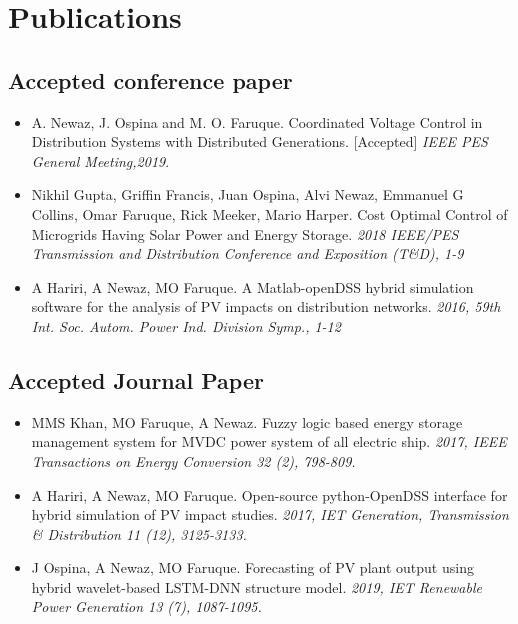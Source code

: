 

\section{Publications}
\subsection{Accepted conference paper}
\begin{itemize}
    \item A. Newaz, J. Ospina and M. O. Faruque. Coordinated Voltage Control in Distribution Systems with Distributed Generations. [Accepted] \textit{IEEE PES General Meeting,2019}.
    \item Nikhil Gupta, Griffin Francis, Juan Ospina, Alvi Newaz, Emmanuel G Collins, Omar Faruque, Rick Meeker, Mario Harper. Cost Optimal Control of Microgrids Having Solar Power and Energy Storage. \textit{2018 IEEE/PES Transmission and Distribution Conference and Exposition (T\&D), 1-9}
    \item A Hariri, A Newaz, MO Faruque. A Matlab-openDSS hybrid simulation software for the analysis of PV impacts on distribution networks. \textit{2016, 59th Int. Soc. Autom. Power Ind. Division Symp., 1-12}
\end{itemize}

\subsection{Accepted Journal Paper}
\begin{itemize}
    \item MMS Khan, MO Faruque, A Newaz. Fuzzy logic based energy storage management system for MVDC power system of all electric ship. \textit{2017, IEEE Transactions on Energy Conversion 32 (2), 798-809.}
    \item A Hariri, A Newaz, MO Faruque. Open-source python-OpenDSS interface for hybrid simulation of PV impact studies. \textit{2017, IET Generation, Transmission \& Distribution 11 (12), 3125-3133.}
    \item J Ospina, A Newaz, MO Faruque. Forecasting of PV plant output using hybrid wavelet-based LSTM-DNN structure model. \textit{2019, IET Renewable Power Generation 13 (7), 1087-1095.}
\end{itemize}

